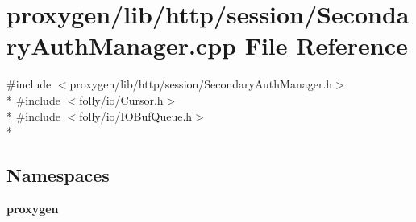 \section{proxygen/lib/http/session/\+Secondary\+Auth\+Manager.cpp File Reference}
\label{SecondaryAuthManager_8cpp}
{\ttfamily \#include $<$proxygen/lib/http/session/\+Secondary\+Auth\+Manager.\+h$>$}\\*
{\ttfamily \#include $<$folly/io/\+Cursor.\+h$>$}\\*
{\ttfamily \#include $<$folly/io/\+I\+O\+Buf\+Queue.\+h$>$}\\*
\subsection*{Namespaces}
\begin{DoxyCompactItemize}
\item 
 {\bf proxygen}
\end{DoxyCompactItemize}
